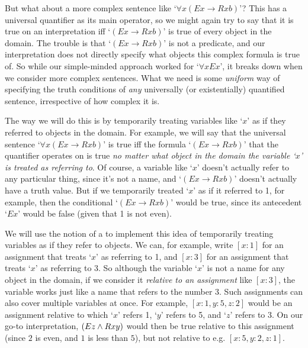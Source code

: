 But what about a more complex sentence like `$\forall x(Ex \rightarrow Rxb)$'?  This has a universal quantifier as its main operator, so we might again try to say that it is true on an interpretation iff `$(Ex \rightarrow Rxb)$' is true of every object in the domain.  The trouble is that `$(Ex \rightarrow Rxb)$' is not a predicate, and our interpretation does not directly specify what objects this complex formula is true of.  So while our simple-minded approach worked for `$\forall xEx$', it breaks down when we consider more complex sentences.  What we need is some \emph{uniform} way of specifying the truth conditions of \emph{any} universally (or existentially) quantified sentence, irrespective of how complex it is.


The way we will do this is by temporarily treating variables like `$x$' as if they referred to objects in the domain.  For example, we will say that the universal sentence `$\forall x(Ex \rightarrow Rxb)$' is true iff the formula `$(Ex \rightarrow Rxb)$' that the quantifier operates on is true \emph{no matter what object in the domain the variable `$x$'  is treated as referring to}. Of course, a variable like `$x$' doesn't actually refer to any particular thing, since it's not a name, and `$(Ex \rightarrow Rxb)$' doesn't actually have a truth value.  But if we temporarily treated `$x$' as if it referred to 1, for example, then the conditional `$(Ex \rightarrow Rxb)$' would be true, since its antecedent `$Ex$' would be false (given that 1 is not even).


We will use the notion of a  to implement this idea of temporarily treating variables as if they refer to objects.  We can, for example, write $[x:1]$ for an assignment that treats `$x$' as referring to 1, and $[x:3]$ for an assignment that treats `$x$' as referring to 3.  So although the variable `$x$' is not a name for any object in the domain, if we consider it \emph{relative to an assignment} like $[x:3]$, the variable works just like a name that refers to the number 3.  Such assignments can also cover multiple variables at once.  For example, $[x: 1, y:5, z:2]$ would be an assignment relative to which `$x$' refers 1, `$y$' refers to 5, and `$z$' refers to 3.  On our go-to interpretation, $(Ez \wedge Rxy)$ would then be true relative to this assignment (since $2$ is even, and $1$ is less than $5$), but not relative to e.g. $[x:5, y: 2, z: 1]$.

